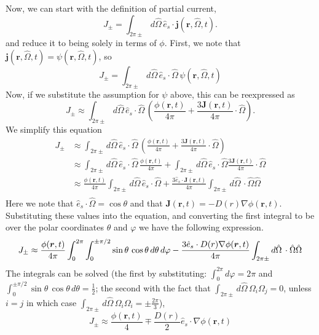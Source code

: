 \documentclass{article}
\newcommand{\Oh}{\hat{\Omega}}
\newcommand{\cur}{\bm{J}}
\newcommand{\rt}{(\bm{r},t)}
\newcommand{\rOt}{(\bm{r},\Oh,t)}
\begin{document}
Now, we can start with the definition of partial current,
$$ J_{\pm} = \int_{2\pi\pm} d\Oh \, \hat{e}_s \cdot \bm{j}\rOt .$$
and reduce it to being solely in terms of $\phi$. First, we note that $\bm{j}\rOt = \psi\rOt$, so
$$ J_{\pm} = \int_{2\pi\pm} d\Oh \, \hat{e}_s \cdot \Oh \, \psi\rOt $$
Now, if we substitute the assumption for $\psi$ above, this can be reexpressed as
$$ J_{\pm} \approx \int_{2\pi\pm} d\Oh \, \hat{e}_s \cdot \Oh \, \left(\frac{\phi\rt}{4\pi} + \frac{3\cur\rt}{4\pi}\cdot \Oh\right) .$$
We simplify this equation
\begin{align*}
J_{\pm}	&\approx \int_{2\pi\pm} d\Oh \, \hat{e}_s \cdot \Oh \, \left(\frac{\phi\rt}{4\pi} + \frac{3\cur\rt}{4\pi}\cdot \Oh\right) \\
		&\approx \int_{2\pi\pm} d\Oh \, \hat{e}_s \cdot \Oh \, \frac{\phi\rt}{4\pi} + \int_{2\pi\pm} d\Oh \, \hat{e}_s \cdot \Oh \frac{3\cur\rt}{4\pi}\cdot \Oh \\
		&\approx \frac{\phi\rt}{4\pi} \int_{2\pi\pm} d\Oh \, \hat{e}_s \cdot \Oh + \frac{3\hat{e}_s \cdot \cur\rt}{4\pi} \int_{2\pi\pm} d\Oh \, \cdot \Oh\Oh \\
\end{align*}
Here we note that $\hat{e}_s \cdot \Oh = \cos\theta$ and that $\cur\rt = -D(r)\nabla\phi\rt$. Substituting these values into the equation, and converting the first integral to be over the polar coordinates $\theta$ and $\varphi$ we have the following expression.
$$ J_{\pm} \approx \frac{\phi\rt}{4\pi} \int_{0}^{2\pi}\int_{0}^{\pm\pi/2} \sin\theta \, \cos\theta \, d\theta \, d\varphi - \frac{3\hat{e}_s\cdot D(r)\nabla\phi\rt}{4\pi} \int_{2\pi\pm} d\Oh \, \cdot \Oh\Oh \\$$
The integrals can be solved (the first by substituting: $\int_{0}^{2\pi}d\varphi = 2\pi$ and $\int_{0}^{\pm\pi/2}\sin\theta \, \cos\theta \, d\theta = \frac{1}{2}$; the second with the fact that $\int_{2\pi\pm} d\Oh \, \Omega_i\Omega_j = 0$, unless $i=j$ in which case $\int_{2\pi\pm} d\Oh \, \Omega_i\Omega_i = \pm\frac{2\pi}{3}$),
$$ J_{\pm} \approx \frac{\phi\rt}{4} \mp \frac{D(r)}{2}\hat{e}_s \cdot \nabla\phi\rt$$


\end{document}
